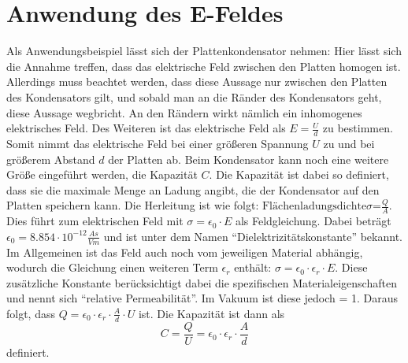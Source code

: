 \section{Anwendung des E-Feldes}
\label{sec:Plattenkondensator}
Als Anwendungsbeispiel lässt sich der Plattenkondensator nehmen:
Hier lässt sich die Annahme treffen, dass das elektrische Feld zwischen den Platten homogen ist.
Allerdings muss beachtet werden, dass diese Aussage nur zwischen den Platten des Kondensators gilt, und sobald man an die Ränder des Kondensators geht, diese Aussage wegbricht.
An den Rändern wirkt nämlich ein inhomogenes elektrisches Feld.
Des Weiteren ist das elektrische Feld als $E = \frac{U}{d}$ zu bestimmen.
Somit nimmt das elektrische Feld bei einer größeren Spannung $U$ zu und bei größerem Abstand $d$ der Platten ab.
Beim Kondensator kann noch eine weitere Größe eingeführt werden, die Kapazität $C$.
Die Kapazität ist dabei so definiert, dass sie die maximale Menge an Ladung angibt, die der Kondensator auf den Platten speichern kann.
Die Herleitung ist wie folgt:
$\mbox{Flächenladungsdichte} \sigma \mbox{=} \frac{Q}{A}$.
Dies führt zum elektrischen Feld mit $\sigma = \epsilon_0 \cdot E$ als Feldgleichung.
Dabei beträgt $\epsilon_0 = 8.854 \cdot 10^{-12} \frac{As}{Vm}$ und ist unter dem Namen "`Dielektrizitätskonstante"' bekannt.
Im Allgemeinen ist das Feld auch noch vom jeweiligen Material abhängig, wodurch die Gleichung einen weiteren Term $\epsilon_r$ enthält: $\sigma = \epsilon_0 \cdot \epsilon_r \cdot E$.
Diese zusätzliche Konstante berücksichtigt dabei die spezifischen Materialeigenschaften und nennt sich "`relative Permeabilität"'.
Im Vakuum ist diese jedoch = 1.
Daraus folgt, dass $ Q = \epsilon_0 \cdot \epsilon_r \cdot \frac{A}{d} \cdot U$ ist.
Die Kapazität ist dann als
\begin{equation*}
    C = \frac{Q}{U} = \epsilon_0 \cdot \epsilon_r \cdot \frac{A}{d}
\end{equation*}
definiert.
